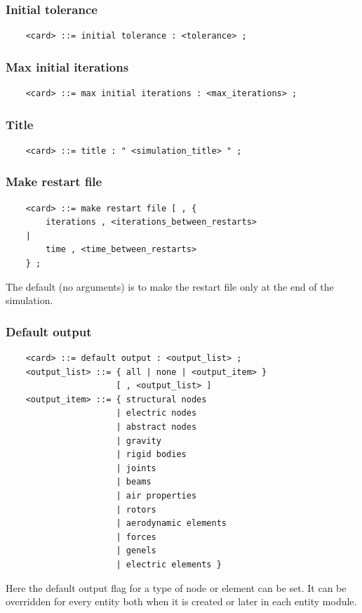 \documentclass[10pt,dvips]{report}
\begin{document}
\subsubsection{Initial tolerance}
\begin{verbatim}
    <card> ::= initial tolerance : <tolerance> ;
\end{verbatim}

\subsubsection{Max initial iterations}
\begin{verbatim}
    <card> ::= max initial iterations : <max_iterations> ;
\end{verbatim}

\subsubsection{Title}
\begin{verbatim}
    <card> ::= title : " <simulation_title> " ;
\end{verbatim}

\subsubsection{Make restart file}
\begin{verbatim}
    <card> ::= make restart file [ , {
        iterations , <iterations_between_restarts>
    |
        time , <time_between_restarts>
    } ;    
\end{verbatim}
The default (no arguments) is to make the restart file only at the end of
the simulation.

\subsubsection{Default output}
\begin{verbatim}
    <card> ::= default output : <output_list> ;
    <output_list> ::= { all | none | <output_item> } 
                      [ , <output_list> ]
    <output_item> ::= { structural nodes
                      | electric nodes
                      | abstract nodes
                      | gravity
                      | rigid bodies
                      | joints
                      | beams
                      | air properties
                      | rotors
                      | aerodynamic elements
                      | forces
                      | genels
                      | electric elements }
\end{verbatim}
Here the default output flag for a type of node or element can be set. It
can be overridden for every entity both when it is created or later in
each entity module.
\end{document}
